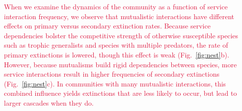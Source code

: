\documentclass[twocolumn,preprintnumbers,amsmath,amssymb,superscriptaddress,linenumbers]{revtex4-1}
\newcommand{\rev}[1]{\textcolor{crimson}{#1}}
\begin{document}

\rev{When we examine the dynamics of the community as a function of service interaction frequency, we observe that mutualistic interactions have different effects on primary versus secondary extinction rates.
Because service dependencies bolster the competitive strength of otherwise susceptible species such as trophic generalists and species with multiple predators, the rate of primary extinctions is lowered, though this effect is weak (Fig.\ \ref{fig:nest}b).
However, because mutualisms build rigid dependencies between species, more service interactions result in higher frequencies of secondary extinctions (Fig.\ \ref{fig:nest}c). 
In communities with many mutualistic interactions, this combined influence yields extinctions that are less likely to occur, but lead to larger cascades when they do.
}
\end{document}
